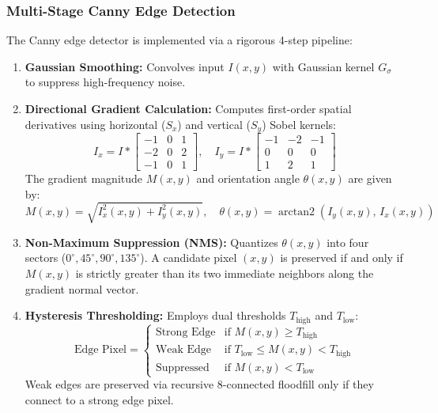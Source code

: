 \subsubsection{Multi-Stage Canny Edge Detection}
The Canny edge detector is implemented via a rigorous 4-step pipeline:
\begin{enumerate}
    \item \textbf{Gaussian Smoothing:} Convolves input $I(x,y)$ with Gaussian kernel $G_\sigma$ to suppress high-frequency noise.
    \item \textbf{Directional Gradient Calculation:} Computes first-order spatial derivatives using horizontal ($S_x$) and vertical ($S_y$) Sobel kernels:
    \begin{equation}
        I_x = I * \begin{bmatrix} -1 & 0 & 1 \\ -2 & 0 & 2 \\ -1 & 0 & 1 \end{bmatrix}, \quad I_y = I * \begin{bmatrix} -1 & -2 & -1 \\ 0 & 0 & 0 \\ 1 & 2 & 1 \end{bmatrix}
    \end{equation}
    The gradient magnitude $M(x,y)$ and orientation angle $\theta(x,y)$ are given by:
    \begin{equation}
        M(x,y) = \sqrt{I_x^2(x,y) + I_y^2(x,y)}, \quad \theta(x,y) = \operatorname{arctan2}\left(I_y(x,y),\, I_x(x,y)\right)
    \end{equation}
    \item \textbf{Non-Maximum Suppression (NMS):} Quantizes $\theta(x,y)$ into four sectors ($0^\circ, 45^\circ, 90^\circ, 135^\circ$). A candidate pixel $(x,y)$ is preserved if and only if $M(x,y)$ is strictly greater than its two immediate neighbors along the gradient normal vector.
    \item \textbf{Hysteresis Thresholding:} Employs dual thresholds $T_{\text{high}}$ and $T_{\text{low}}$:
    \begin{equation}
        \text{Edge Pixel} = \begin{cases} 
            \text{Strong Edge} & \text{if } M(x,y) \ge T_{\text{high}} \\
            \text{Weak Edge} & \text{if } T_{\text{low}} \le M(x,y) < T_{\text{high}} \\
            \text{Suppressed} & \text{if } M(x,y) < T_{\text{low}}
        \end{cases}
    \end{equation}
    Weak edges are preserved via recursive 8-connected floodfill only if they connect to a strong edge pixel.
\end{enumerate}

